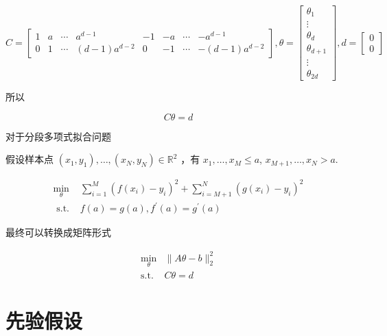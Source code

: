 \begin{notation}
    $$ C=\left[\begin{array}{cccccccc}1 & a & \cdots & a^{d-1} & -1 & -a & \cdots & -a^{d-1} \\ 0 & 1 & \cdots & (d-1) a^{d-2} & 0 & -1 & \cdots & -(d-1) a^{d-2}\end{array}\right], 
    \theta =\left[\begin{array}{ c }
        \theta _{1}\\
        \vdots \\
        \theta _{d}\\
        \theta _{d+1}\\
        \vdots \\
        \theta _{2d}
        \end{array}\right], 
    d=\left[\begin{array}{l}0 \\ 0\end{array}\right] $$
\end{notation}


所以

$$ C \theta=d $$

对于分段多项式拟合问题

\begin{problem}[分段多项式拟合问题]
    假设样本点 $ \left(x_{1}, y_{1}\right), \ldots,\left(x_{N}, y_{N}\right) \in \mathbb{R}^{2} $ ，有 $ x_{1}, \ldots, x_{M} \leq a $, $ x_{M+1}, \ldots, x_{N}>a $.

     $$\begin{array}{ll}\min _{\theta} & \sum_{i=1}^{M}\left(f\left(x_{i}\right)-y_{i}\right)^{2}+\sum_{i=M+1}^{N}\left(g\left(x_{i}\right)-y_{i}\right)^{2} \\ \text { s.t. } & f(a)=g(a), f^{\prime}(a)=g^{\prime}(a)\end{array}$$
\end{problem}

最终可以转换成矩阵形式

\begin{problem}
    $$\begin{aligned}
        \min _{\theta}&\|A \theta-b\|_{2}^{2}\\
       \text{s.t.} & C \theta=d
    \end{aligned}$$

\end{problem}

\section{先验假设}


